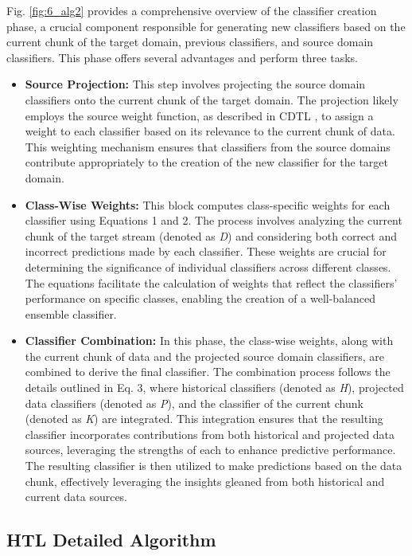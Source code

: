 Fig. \ref{fig:6_alg2} provides a comprehensive overview of the classifier creation phase, a crucial component responsible for generating new classifiers based on the current chunk of the target domain, previous classifiers, and source domain classifiers. This phase offers several advantages and perform three tasks. \begin{itemize}
	\item \textbf{Source Projection:} This step involves projecting the source domain classifiers onto the current chunk of the target domain. The projection likely employs the source weight function, as described in CDTL \cite{yang2021concept}, to assign a weight to each classifier based on its relevance to the current chunk of data. This weighting mechanism ensures that classifiers from the source domains contribute appropriately to the creation of the new classifier for the target domain.
	\item \textbf{Class-Wise Weights:} This block computes class-specific weights for each classifier using Equations 1 and 2. The process involves analyzing the current chunk of the target stream (denoted as \emph{D}) and considering both correct and incorrect predictions made by each classifier. These weights are crucial for determining the significance of individual classifiers across different classes. The equations facilitate the calculation of weights that reflect the classifiers' performance on specific classes, enabling the creation of a well-balanced ensemble classifier.
	\item \textbf{Classifier Combination:} In this phase, the class-wise weights, along with the current chunk of data and the projected source domain classifiers, are combined to derive the final classifier. The combination process follows the details outlined in Eq. 3, where historical classifiers (denoted as \emph{H}), projected data classifiers (denoted as \emph{P}), and the classifier of the current chunk (denoted as \emph{K}) are integrated. This integration ensures that the resulting classifier incorporates contributions from both historical and projected data sources, leveraging the strengths of each to enhance predictive performance. The resulting classifier is then utilized to make predictions based on the data chunk, effectively leveraging the insights gleaned from both historical and current data sources.
\end{itemize}

\subsection{HTL Detailed Algorithm}

